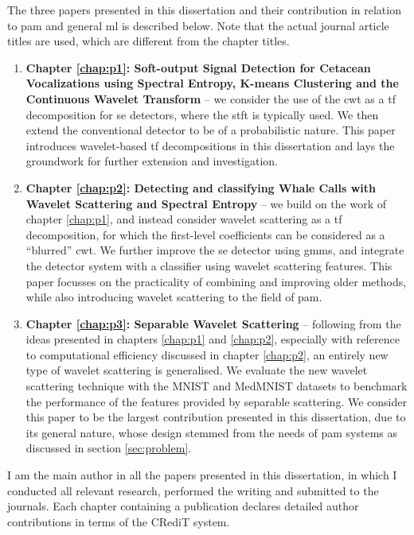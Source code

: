 The three papers presented in this dissertation and their contribution in relation to \ac{pam} and general \ac{ml} is described below. Note that the actual journal article titles are used, which are different from the chapter titles.

\clearpage
\begin{enumerate}
    \item \textbf{Chapter \ref*{chap:p1}: Soft-output Signal Detection for Cetacean Vocalizations using Spectral Entropy, K-means Clustering and the Continuous Wavelet Trans\-form} -- we consider the use of the \ac{cwt} as a \ac{tf} decomposition for \ac{se} detectors, where the \ac{stft} is typically used. We then extend the conventional detector to be of a probabilistic nature. This paper introduces wavelet-based \ac{tf} decompositions in this dissertation and lays the groundwork for further extension and investigation.
    \item \textbf{Chapter \ref*{chap:p2}: Detecting and classifying Whale Calls with Wavelet Scatter\-ing and Spectral Entropy} -- we build on the work of chapter \ref*{chap:p1}, and instead consider wavelet scattering as a \ac{tf} decomposition, for which the first-level coeffi\-cients can be considered as a ``blurred'' \ac{cwt}. We further improve the \ac{se} detector using \acfp{gmm}, and integrate the detector system with a classifier using wavelet scattering features. This paper focusses on the practicality of combining and improving older methods, while also introducing wavelet scattering to the field of \ac{pam}.
    \item \textbf{Chapter \ref*{chap:p3}: Separable Wavelet Scattering} -- following from the ideas presented in chapters \ref*{chap:p1} and \ref*{chap:p2}, especially with reference to computational efficiency discussed in chapter \ref*{chap:p2}, an entirely new type of wavelet scattering is generalised. We evaluate the new wavelet scattering technique with the MNIST and MedMNIST datasets to benchmark the performance of the features provided by separable scattering. We consider this paper to be the largest contribution presented in this dissertation, due to its general nature, whose design stemmed from the needs of \ac{pam} systems as discussed in section \ref*{sec:problem}.
\end{enumerate}

I am the main author in all the papers presented in this dissertation, in which I conducted all relevant research, performed the writing and submitted to the journals. Each chapter containing a publication declares detailed author contributions in terms of the CRediT system.